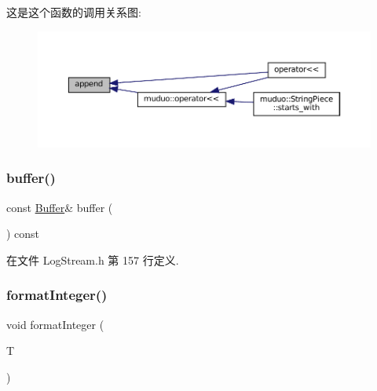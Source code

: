 这是这个函数的调用关系图\+:
\nopagebreak
\begin{figure}[H]
\begin{center}
\leavevmode
\includegraphics[width=350pt]{classmuduo_1_1LogStream_ad01a92f970117814c81b686b871558bc_icgraph}
\end{center}
\end{figure}
\mbox{\label{classmuduo_1_1LogStream_a78bcd01119fe550b2a28f8f7aedb828a}} 
\subsubsection{\texorpdfstring{buffer()}{buffer()}}
{\footnotesize\ttfamily const \hyperlink{classmuduo_1_1LogStream_ad711cf53b5df9fac2d62ecd2b9a8f763}{Buffer}\& buffer (\begin{DoxyParamCaption}{ }\end{DoxyParamCaption}) const\hspace{0.3cm}{\ttfamily [inline]}}



在文件 Log\+Stream.\+h 第 157 行定义.

\mbox{\label{classmuduo_1_1LogStream_a0f835c30aa3591182cc7c82a8193cc9f}} 
\subsubsection{\texorpdfstring{format\+Integer()}{formatInteger()}}
{\footnotesize\ttfamily void format\+Integer (\begin{DoxyParamCaption}\item[{T}]{ }\end{DoxyParamCaption})\hspace{0.3cm}{\ttfamily [private]}}


